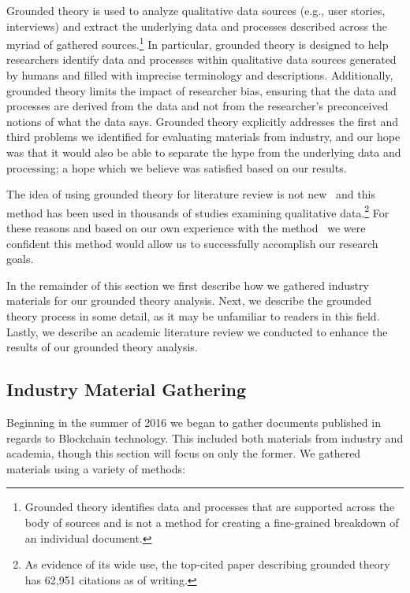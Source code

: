 Grounded theory is used to analyze qualitative data sources (e.g., user stories, interviews) and extract the underlying data and processes described across the myriad of gathered sources.\footnote{Grounded theory identifies data and processes that are supported across the body of sources and is not a method for creating a fine-grained breakdown of an individual document.}
In particular, grounded theory is designed to help researchers identify data and processes within qualitative data sources generated by humans and filled with imprecise terminology and descriptions.
Additionally, grounded theory limits the impact of researcher bias, ensuring that the data and processes are derived from the data and not from the researcher's preconceived notions of what the data says.
Grounded theory explicitly addresses the first and third problems we identified for evaluating materials from industry, and our hope was that it would also be able to separate the hype from the underlying data and processing; a hope which we believe was satisfied based on our results.

The idea of using grounded theory for literature review is not new~\cite{wolfswinkel2013using,yang2012descriptive} and this method has been used in thousands of studies examining qualitative data.\footnote{As evidence of its wide use, the top-cited paper describing grounded theory has 62,951 citations as of writing.}
For these reasons and based on our own experience with the method~\cite{ruoti2017weighing} we were confident this method would allow us to successfully accomplish our research goals.

In the remainder of this section we first describe how we gathered industry materials for our grounded theory analysis.
Next, we describe the grounded theory process in some detail, as it may be unfamiliar to readers in this field.
Lastly, we describe an academic literature review we conducted to enhance the results of our grounded theory analysis.

\subsection{Industry Material Gathering}
Beginning in the summer of 2016 we began to gather documents published in regards to Blockchain technology.
This included both materials from industry and academia, though this section will focus on only the former.
We gathered materials using a variety of methods:

